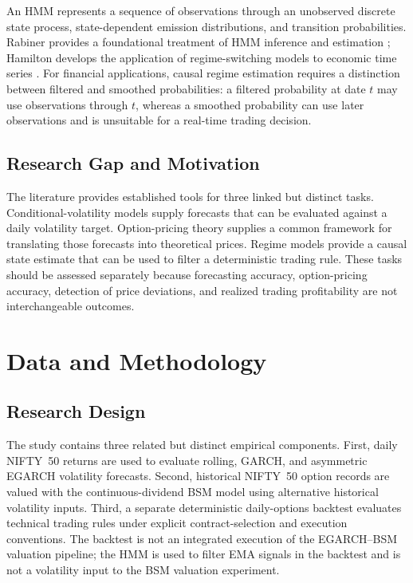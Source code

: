 \documentclass[journal]{IEEEtran}
\begin{document}
An HMM represents a sequence of observations through an unobserved discrete state process, state-dependent emission distributions, and transition probabilities. Rabiner provides a foundational treatment of HMM inference and estimation \cite{rabiner1989}; Hamilton develops the application of regime-switching models to economic time series \cite{hamilton1994}. For financial applications, causal regime estimation requires a distinction between filtered and smoothed probabilities: a filtered probability at date $t$ may use observations through $t$, whereas a smoothed probability can use later observations and is unsuitable for a real-time trading decision.

\subsection{Research Gap and Motivation}

The literature provides established tools for three linked but distinct tasks. Conditional-volatility models supply forecasts that can be evaluated against a daily volatility target. Option-pricing theory supplies a common framework for translating those forecasts into theoretical prices. Regime models provide a causal state estimate that can be used to filter a deterministic trading rule. These tasks should be assessed separately because forecasting accuracy, option-pricing accuracy, detection of price deviations, and realized trading profitability are not interchangeable outcomes.

\section{Data and Methodology}

\subsection{Research Design}

The study contains three related but distinct empirical components. First, daily NIFTY~50 returns are used to evaluate rolling, GARCH, and asymmetric EGARCH volatility forecasts. Second, historical NIFTY~50 option records are valued with the continuous-dividend BSM model using alternative historical volatility inputs. Third, a separate deterministic daily-options backtest evaluates technical trading rules under explicit contract-selection and execution conventions. The backtest is not an integrated execution of the EGARCH--BSM valuation pipeline; the HMM is used to filter EMA signals in the backtest and is not a volatility input to the BSM valuation experiment.
\end{document}
